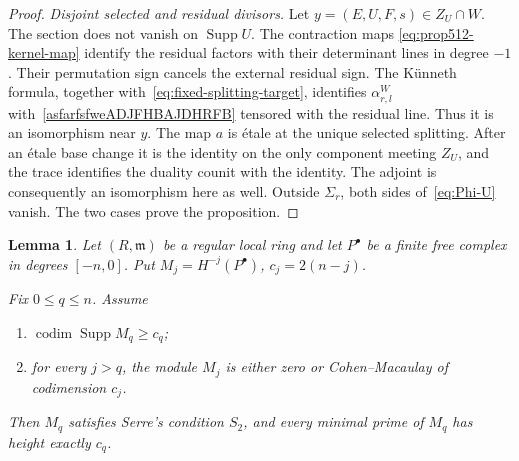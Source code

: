\documentclass[11pt,letterpaper]{amsart}
\theoremstyle{plain}
\newtheorem{lemma}[theorem]{Lemma}
\theoremstyle{definition}
\theoremstyle{remark}
\numberwithin{equation}{section}
\DeclareMathOperator{\codim}{codim}
\DeclareMathOperator{\Supp}{Supp}
\begin{document}
\begin{proof}
\smallskip
\noindent\textit{Disjoint selected and residual divisors.}
Let $y=(E,U,F,s)\in Z_U\cap W$. The section does not vanish on
$\Supp U$. The contraction maps \eqref{eq:prop512-kernel-map}
identify the residual factors with their determinant lines in degree $-1$.
Their permutation sign cancels the external residual sign.
The K\"unneth formula, together with~\eqref{eq:fixed-splitting-target},
identifies $\alpha^W_{r,l}$ with~\eqref{asfarfsfweADJFHBAJDHRFB}
tensored with the residual line. Thus it is an isomorphism near $y$.
The map $a$ is \'etale at the unique selected splitting. After an
\'etale base change it is the identity on the only component meeting
$Z_U$, and the trace identifies the duality counit with the identity.
The adjoint is consequently an isomorphism here as well.
Outside $\Sigma_r$, both sides of~\eqref{eq:Phi-U} vanish.
The two cases prove the proposition.
\end{proof}


\begin{lemma}\label{lem:S2}
Let $(R,\mathfrak m)$ be a regular local ring and let $P^\bullet$ be a finite free complex in degrees $[-n,0]$.  Put
$M_j=H^{-j}(P^\bullet)$, $c_j=2(n-j)$.

Fix $0\le q\le n$.  Assume
\begin{enumerate}
\item $\codim\Supp M_q\ge c_q$;
\item for every $j>q$, the module $M_j$ is either zero or Cohen--Macaulay of codimension $c_j$.
\end{enumerate}
Then $M_q$ satisfies Serre's condition $S_2$, and every minimal prime of $M_q$ has height exactly $c_q$.
\end{lemma}
\end{document}
